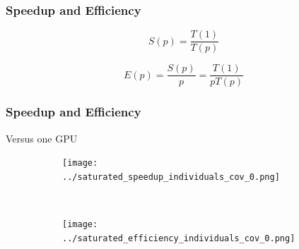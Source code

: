 \documentclass{beamer}
\begin{document}
\begin{frame}
\frametitle{Speedup and Efficiency}

\begin{equation*}
S(p)=\frac{T(1)}{T(p)}
\end{equation*}

\begin{equation*}
E(p)=\frac{S(p)}{p}=\frac{T(1)}{pT(p)}
\end{equation*}

\end{frame}

\begin{frame}
\frametitle{Speedup and Efficiency}

Versus one GPU

\begin{figure}
        \centering
        \begin{subfigure}[b]{0.48\textwidth}
                \texttt{[image: ../saturated\_speedup\_individuals\_cov\_0.png]}
        \end{subfigure}%
        ~
        \begin{subfigure}[b]{0.48\textwidth}
                \texttt{[image: ../saturated\_efficiency\_individuals\_cov\_0.png]}
        \end{subfigure}
\end{figure}

\end{frame}
\end{document}
